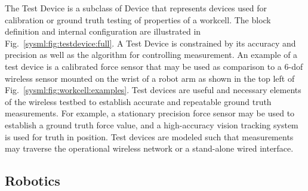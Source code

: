 The Test Device is a subclass of Device that represents devices used for calibration or ground truth testing of properties of a workcell.  The block definition and internal configuration are illustrated in Fig.~\ref{sysml:fig:testdevice:full}.  A Test Device is constrained by its accuracy and precision as well as the algorithm for controlling measurement.  An example of a test device is a calibrated force sensor that may be used as comparison to a 6-\gls{dof} wireless sensor mounted on the wrist of a robot arm as shown in the top left of Fig.~\ref{sysml:fig:workcell:examples}. Test devices are useful and necessary elements of the wireless testbed to establish accurate and repeatable ground truth measurements.  For example, a stationary precision force sensor may be used to establish a ground truth force value, and a high-accuracy vision tracking system is used for truth in position.  Test devices are modeled such that measurements may traverse the operational wireless network or a stand-alone wired interface.

\subsection{Robotics}\label{sysml:sec:robotics}


